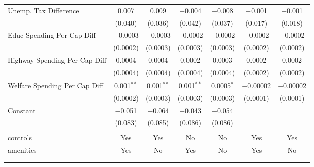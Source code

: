 \begin{table}[!htbp]
\begin{tabular}{@{\extracolsep{5pt}}lcccccc}
  Unemp. Tax Difference & 0.007 & 0.009 & $-$0.004 & $-$0.008 & $-$0.001 & $-$0.001 \\ 
  & (0.040) & (0.036) & (0.042) & (0.037) & (0.017) & (0.018) \\ 
  Educ Spending Per Cap Diff & $-$0.0003 & $-$0.0003 & $-$0.0002 & $-$0.0002 & $-$0.0002 & $-$0.0002 \\ 
  & (0.0002) & (0.0003) & (0.0003) & (0.0003) & (0.0002) & (0.0002) \\ 
  Highway Spending Per Cap Diff & 0.0004 & 0.0004 & 0.0002 & 0.0003 & 0.0002 & 0.0002 \\ 
  & (0.0004) & (0.0004) & (0.0004) & (0.0004) & (0.0002) & (0.0002) \\ 
  Welfare Spending Per Cap Diff & 0.001$^{**}$ & 0.001$^{**}$ & 0.001$^{**}$ & 0.0005$^{*}$ & $-$0.00002 & $-$0.00002 \\ 
  & (0.0002) & (0.0003) & (0.0003) & (0.0003) & (0.0001) & (0.0001) \\ 
  Constant & $-$0.051 & $-$0.064 & $-$0.043 & $-$0.054 &  &  \\ 
  & (0.083) & (0.085) & (0.086) & (0.086) &  &  \\ 
 \hline \\[-1.8ex] 
controls & Yes & Yes & No & No & Yes & Yes \\ 
amenities & Yes & No & Yes & No & Yes & No \\ 
\hline \\[-1.8ex] 
\hline 
\hline \\[-1.8ex] 
\end{tabular} 
\end{table} 

